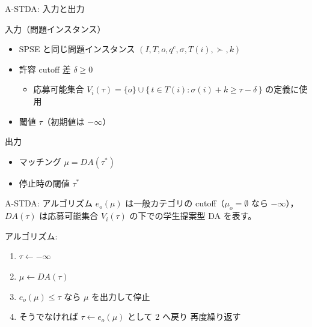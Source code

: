 \documentclass[aspectratio=43,11pt]{beamer}
\newcommand{\muc}[1]{\mu_{#1}}
\newcommand{\eo}{e_o}
\newcommand{\score}{\sigma}
\begin{document}
\begin{frame}{A-STDA: 入力と出力}
  \begin{block}{入力（問題インスタンス）}
    \begin{itemize}
      \item SPSE と同じ問題インスタンス
        $\left(I, T, o, q^c, \score, T(i), \succ, k\right)$
      \item 許容 cutoff 差 $\delta \ge 0$
        \begin{itemize}
          \item 応募可能集合
            $V_i(\tau) = \{o\} \cup
             \{\, t \in T(i) : \score(i) + k \ge \tau - \delta \,\}$
            の定義に使用
        \end{itemize}
      \item 閾値 $\tau$（初期値は $-\infty$）
    \end{itemize}
  \end{block}

  \begin{block}{出力}
    \begin{itemize}
      \item マッチング $\mu = DA(\tau^{*})$
      \item 停止時の閾値 $\tau^{*}$
    \end{itemize}
  \end{block}
\end{frame}

\begin{frame}{A-STDA: アルゴリズム}
  $\eo(\mu)$ は一般カテゴリの cutoff（$\muc{o} = \emptyset$ なら $-\infty$），
  $DA(\tau)$ は応募可能集合 $V_i(\tau)$ の下での学生提案型 DA を表す。

  \vspace{1em}
  アルゴリズム:
  \begin{enumerate}
    \item $\tau \leftarrow -\infty$
    \item $\mu \leftarrow DA(\tau)$
    \item $\eo(\mu) \le \tau$ なら $\mu$ を出力して停止
    \item そうでなければ $\tau \leftarrow \eo(\mu)$ として 2 へ戻り
      再度繰り返す
  \end{enumerate}
\end{frame}
\end{document}
